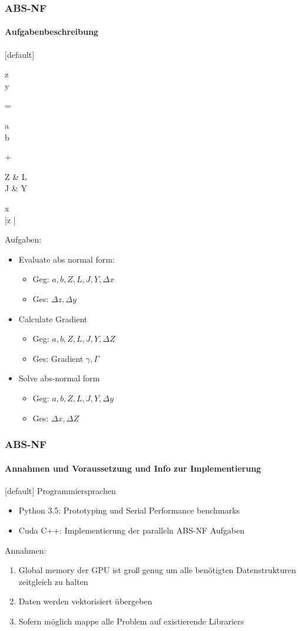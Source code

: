 \begin{frame}
	\frametitle{ABS-NF}
	\framesubtitle{Aufgabenbeschreibung}
	[default]
	\begin{flalign*}
	\begin{pmatrix}
	\Delta z \\
	\Delta y
	\end{pmatrix}
	= 
	\begin{pmatrix}
	a \\
	b
	\end{pmatrix}
	+
	\begin{pmatrix}
	Z & L \\
	J & Y 
	\end{pmatrix}
	\times
	\begin{pmatrix}
	\Delta x \\
	|\Delta z |
	\end{pmatrix}
	\end{flalign*}
	Aufgaben:
	\begin{itemize}
		\item <1-> Evaluate abs normal form:
			\begin{itemize}
				\item Geg: $a,b,Z,L,J,Y,\Delta x$
				\item Ges: $\Delta z, \Delta y$
			\end{itemize}
		\item <2-> Calculate Gradient
			\begin{itemize}
				\item Geg: $a,b,Z,L,J,Y, \Delta Z$
				\item Ges: Gradient $\gamma, \Gamma$
			\end{itemize}
		\item <3-> Solve abs-normal form
		\begin{itemize}
			\item Geg: $a,b,Z,L,J,Y,\Delta y$
			\item Ges: $\Delta x, \Delta Z$
		\end{itemize}
	\end{itemize}
\end{frame}
\begin{frame}
	\frametitle{ABS-NF}
	\framesubtitle{Annahmen und Voraussetzung und Info zur Implementierung}
	[default]
	Programmiersprachen
	\begin{itemize}
		\item Python 3.5: Prototyping und Serial Performance benchmarks
		\item Cuda C++: Implementierung der paralleln ABS-NF Aufgaben
	\end{itemize}
	
	Annahmen:
	\begin{enumerate}
		\item Global memory der GPU ist groß genug um alle benötigten Datenstrukturen zeitgleich zu halten
		\item Daten werden vektorisiert übergeben
		\item Sofern möglich mappe alle Problem auf existierende Librariers
	\end{enumerate}
	
\end{frame}
